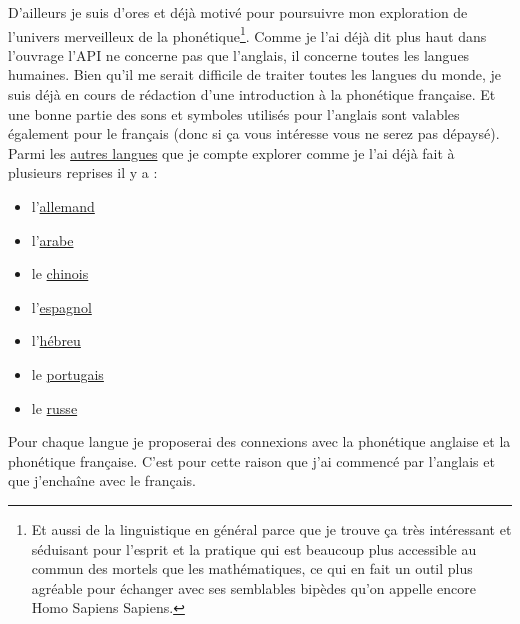 D'ailleurs je suis d'ores et déjà motivé pour poursuivre mon
exploration de l'univers merveilleux de la phonétique\footnote{Et
  aussi de la linguistique en général parce que je trouve ça très
  intéressant et séduisant pour l'esprit et la pratique qui est
  beaucoup plus accessible au commun des mortels que les
  mathématiques, ce qui en fait un outil plus agréable pour échanger
  avec ses semblables bipèdes qu'on appelle encore Homo Sapiens
  Sapiens.}. Comme je l'ai déjà dit plus haut dans l'ouvrage l'API ne
concerne pas que l'anglais, il concerne toutes les langues
humaines. Bien qu'il me serait difficile de traiter toutes les langues
du monde, je suis déjà en cours de rédaction d'une introduction à la
phonétique française. Et une bonne partie des sons et symboles
utilisés pour l'anglais sont valables également pour le
français (donc si ça vous intéresse vous ne serez pas dépaysé). Parmi les \href{https://www.youtube.com/playlist?list=PLfKvL-VUSKAnkBk88BAb3oq1MlGVnhwcY}{autres
  langues} que je compte explorer comme je l'ai déjà fait à plusieurs
reprises il y a :
\begin{itemize}
  \item  l'\href{https://www.youtube.com/playlist?list=PLfKvL-VUSKAnM9MWJT9F1z1QZTdb73i7r}{allemand}
  \item
    l'\href{https://www.youtube.com/playlist?list=PLfKvL-VUSKAkXu2x3Fp74QxxYUVP43haA}{arabe}
  \item le
    \href{https://www.youtube.com/playlist?list=PLfKvL-VUSKAl4R0Mh7sKvQjqCsiEEa6D9}{chinois}
  \item
    l'\href{https://www.youtube.com/playlist?list=PLfKvL-VUSKAm_p6ikI_pTbxNuHco73REt}{espagnol}
  \item
    l'\href{https://www.youtube.com/playlist?list=PLfKvL-VUSKAkbDhpbtXc7RdroMBBeTJx0}{hébreu}
  \item le
    \href{https://www.youtube.com/playlist?list=PLfKvL-VUSKAn0zUUPYsMDd8_1J_UtfRxh}{portugais}
  \item le \href{https://www.youtube.com/playlist?list=PLfKvL-VUSKAk0YrJ3rV6cBj-w6rNCeOJB}{russe}
  \end{itemize}

Pour chaque langue je proposerai des connexions avec la phonétique
anglaise et la phonétique française. C'est pour cette raison que j'ai
commencé par l'anglais et que j'enchaîne avec le français.

